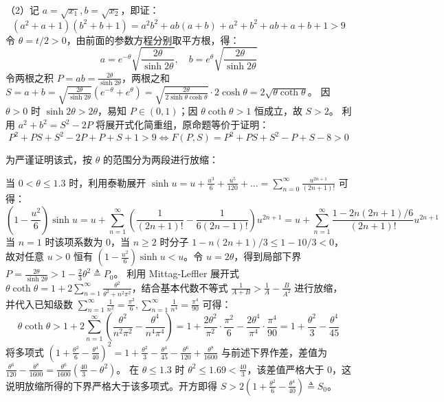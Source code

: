 \begin{solution}
（2）记 $a = \sqrt{x_1}, b = \sqrt{x_2}$，即证：
\[ (a^2 + a + 1)(b^2 + b + 1) = a^2 b^2 + ab(a+b) + a^2 + b^2 + ab + a + b + 1 > 9 \]
令 $\theta = t/2 > 0$，由前面的参数方程分别取平方根，得：
\[ a = e^{-\theta} \sqrt{ \frac{2\theta}{\sinh 2\theta} }, \quad b = e^{\theta} \sqrt{ \frac{2\theta}{\sinh 2\theta} } \]
令两根之积 $P = ab = \frac{2\theta}{\sinh 2\theta}$，两根之和 $S = a + b = \sqrt{\frac{2\theta}{\sinh 2\theta}} (e^{-\theta} + e^\theta) = \sqrt{\frac{2\theta}{2\sinh \theta \cosh \theta}} \cdot 2\cosh \theta = 2 \sqrt{\theta \coth \theta}$。
因 $\theta > 0$ 时 $\sinh 2\theta > 2\theta$，易知 $P \in (0, 1)$；因 $\theta \coth \theta > 1$ 恒成立，故 $S > 2$。
利用 $a^2 + b^2 = S^2 - 2P$ 将展开式化简重组，原命题等价于证明：
\[ P^2 + PS + S^2 - 2P + P + S + 1 > 9 \iff F(P, S) = P^2 + PS + S^2 - P + S - 8 > 0 \]

为严谨证明该式，按 $\theta$ 的范围分为两段进行放缩：

当 $0 < \theta \le 1.3$ 时，利用泰勒展开 $\sinh u = u + \frac{u^3}{6} + \frac{u^5}{120} + \dots = \sum_{n=0}^\infty \frac{u^{2n+1}}{(2n+1)!}$ 可得：
\[ \left(1 - \frac{u^2}{6}\right)\sinh u = u + \sum_{n=1}^\infty \left( \frac{1}{(2n+1)!} - \frac{1}{6(2n-1)!} \right) u^{2n+1} = u + \sum_{n=1}^\infty \frac{1 - 2n(2n+1)/6}{(2n+1)!} u^{2n+1} \]
当 $n=1$ 时该项系数为 $0$，当 $n \ge 2$ 时分子 $1 - n(2n+1)/3 \le 1 - 10/3 < 0$，故对任意 $u>0$ 恒有 $\left(1 - \frac{u^2}{6}\right)\sinh u < u$。令 $u = 2\theta$，得到局部下界 $P = \frac{2\theta}{\sinh 2\theta} > 1 - \frac{2}{3}\theta^2 \triangleq P_0$。
利用 Mittag-Leffler 展开式 $\theta \coth \theta = 1 + 2\sum_{n=1}^\infty \frac{\theta^2}{\theta^2 + n^2 \pi^2}$，结合基本代数不等式 $\frac{1}{A+B} > \frac{1}{A} - \frac{B}{A^2}$ 进行放缩，并代入已知级数 $\sum_{n=1}^\infty \frac{1}{n^2} = \frac{\pi^2}{6}, \sum_{n=1}^\infty \frac{1}{n^4} = \frac{\pi^4}{90}$ 可得：
\[ \theta \coth \theta > 1 + 2\sum_{n=1}^\infty \left( \frac{\theta^2}{n^2\pi^2} - \frac{\theta^4}{n^4\pi^4} \right) = 1 + \frac{2\theta^2}{\pi^2} \cdot \frac{\pi^2}{6} - \frac{2\theta^4}{\pi^4} \cdot \frac{\pi^4}{90} = 1 + \frac{\theta^2}{3} - \frac{\theta^4}{45} \]
将多项式 $\left(1 + \frac{\theta^2}{6} - \frac{\theta^4}{40}\right)^2 = 1 + \frac{\theta^2}{3} - \frac{\theta^4}{45} - \frac{\theta^6}{120} + \frac{\theta^8}{1600}$ 与前述下界作差，差值为 $\frac{\theta^6}{120} - \frac{\theta^8}{1600} = \frac{\theta^6}{1600}\left(\frac{40}{3} - \theta^2\right)$。
在 $\theta \le 1.3$ 时 $\theta^2 \le 1.69 < \frac{40}{3}$，该差值严格大于 $0$，这说明放缩所得的下界严格大于该多项式。开方即得 $S > 2\left(1 + \frac{\theta^2}{6} - \frac{\theta^4}{40}\right) \triangleq S_0$。


\end{solution}
